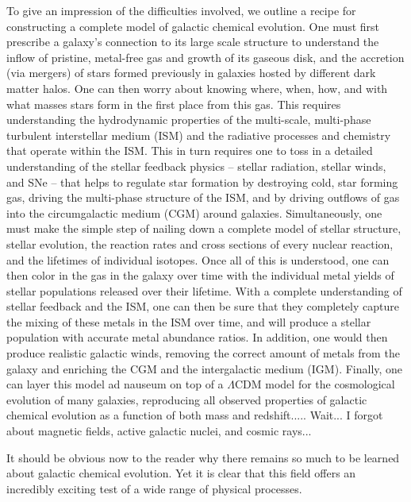 To give an impression of the difficulties involved, we outline a recipe for constructing a complete model of galactic chemical evolution. One must first prescribe a galaxy's connection to its large scale structure to understand the inflow of pristine, metal-free gas and growth of its gaseous disk, and the accretion (via mergers) of stars formed previously in galaxies hosted by different dark matter halos. One can then worry about knowing where, when, how, and with what masses stars form in the first place from this gas. This requires understanding the hydrodynamic
properties of the multi-scale, multi-phase turbulent interstellar medium (ISM) and the radiative processes and chemistry that operate within the ISM. This in turn requires one to toss in a detailed understanding of the stellar feedback physics -- stellar radiation, stellar winds, and SNe -- that helps to regulate star formation by destroying cold, star forming gas, driving the multi-phase structure of the ISM, and by driving outflows of gas into the circumgalactic medium (CGM) around galaxies. Simultaneously, one must make the simple step of nailing down a complete model of stellar structure, stellar evolution, the reaction rates and cross sections of every nuclear reaction, and the lifetimes of individual isotopes. Once all of this is understood, one can then color in the gas in the galaxy over time with the individual metal yields of stellar populations released over their lifetime. With a complete understanding of stellar feedback and the ISM, one can then be sure that they completely capture the mixing of these metals in the ISM over time, and will produce a stellar population with accurate metal abundance ratios. In addition, one would then produce realistic galactic winds, removing the correct amount of metals from the galaxy and enriching the CGM and the intergalactic medium (IGM). Finally, one can layer this model ad nauseum on top of a $\Lambda$CDM model for the cosmological evolution of many galaxies, reproducing all observed properties of galactic chemical evolution as a function of both mass and redshift..... Wait... I forgot about magnetic fields, active galactic nuclei, and cosmic rays...

It should be obvious now to the reader why there remains so much to be learned about galactic chemical evolution. Yet it is clear that this field offers an incredibly exciting test of a wide range of physical processes.

